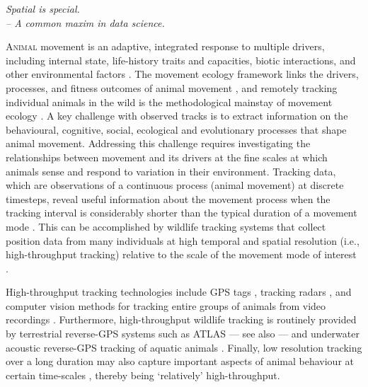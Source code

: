 

\begin{center}
\emph{Spatial is special.\\
\medskip
-- \small{A common maxim in data science.}}
\end{center}

\lettrine{A}{nimal} movement is an adaptive, integrated response to multiple drivers, including internal state, life-history traits and capacities, biotic interactions, and other environmental factors \citep{nathan2008a, holyoak2008}.
The movement ecology framework links the drivers, processes, and fitness outcomes of animal movement \citep{nathan2008a}, and remotely tracking individual animals in the wild is the methodological mainstay of movement ecology \citep{wikelski2007,nathan2008a,hussey2015,kays2015}.
A key challenge with observed tracks is to extract information on the behavioural, cognitive, social, ecological and evolutionary processes that shape animal movement.
Addressing this challenge requires investigating the relationships between movement and its drivers at the fine scales at which animals sense and respond to variation in their environment. 
Tracking data, which are observations of a continuous process (animal movement) at discrete timesteps, reveal useful information about the movement process when the tracking interval is considerably shorter than the typical duration of a movement mode \citep{nathan2008a, noonan2019, getz2008}.
This can be accomplished by wildlife tracking systems that collect position data from many individuals at high temporal and spatial resolution (i.e., high-throughput tracking) relative to the scale of the movement mode of interest \citep{getz2008}.

High-throughput tracking technologies include GPS tags \citep{strandburg-peshkin2015, papageorgiou2019, harel2016, klarevas-irby2021}, tracking radars \citep{horvitz2014}, and computer vision methods for tracking entire groups of animals from video recordings \citep{rathore2020, perez-escudero2014}. 
Furthermore, high-throughput wildlife tracking is routinely provided by terrestrial reverse-GPS systems such as ATLAS \citep[Advanced Tracking and Localization of Animals in real-life Systems:][]{toledo2014, weiser2016, toledo2016,toledo2020} --- see also \citep{maccurdy2009, maccurdy2019} --- and underwater acoustic reverse-GPS tracking of aquatic animals \citep{baktoft2019, baktoft2017, jung2015, aspillaga2021, aspillaga2021a}.
Finally, low resolution tracking over a long duration may also capture important aspects of animal behaviour at certain time-scales \citep[e.g. migration, long-range dispersal;][]{getz2008}, thereby being `relatively' high-throughput.

